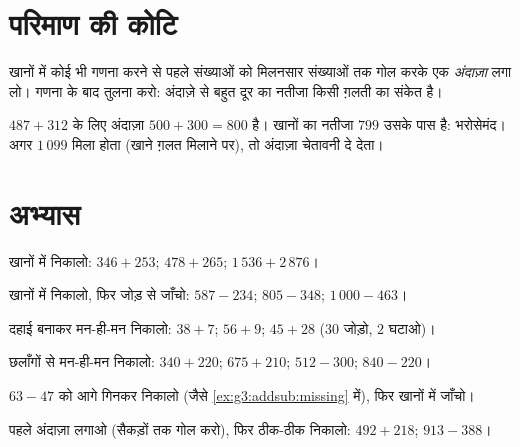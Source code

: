 \section{परिमाण की कोटि}

\begin{method}\label{met:g3:addsub:estimate}
खानों में कोई भी गणना करने से पहले संख्याओं को मिलनसार संख्याओं
तक गोल करके एक \emph{अंदाज़ा} लगा लो। गणना के बाद तुलना करो:
अंदाज़े से बहुत दूर का नतीजा किसी ग़लती का संकेत है।
\end{method}

\begin{example}
$487 + 312$ के लिए अंदाज़ा $500 + 300 = 800$ है। खानों का
नतीजा $799$ उसके पास है: भरोसेमंद। अगर $1\,099$ मिला होता
(खाने ग़लत मिलाने पर), तो अंदाज़ा चेतावनी दे देता।
\end{example}

\section{अभ्यास}

\begin{exercise}[$\star$]\label{exo:g3:addsub:1}
खानों में निकालो: $346 + 253$; \quad $478 + 265$; \quad
$1\,536 + 2\,876$।
\end{exercise}

\begin{exercise}[$\star$]\label{exo:g3:addsub:2}
खानों में निकालो, फिर जोड़ से जाँचो: $587 - 234$; \quad
$805 - 348$; \quad $1\,000 - 463$।
\end{exercise}

\begin{exercise}[$\star$]\label{exo:g3:addsub:3}
दहाई बनाकर मन-ही-मन निकालो: $38 + 7$; \quad $56 + 9$; \quad
$45 + 28$ ($30$ जोड़ो, $2$ घटाओ)।
\end{exercise}

\begin{exercise}[$\star$]\label{exo:g3:addsub:4}
छलाँगों से मन-ही-मन निकालो: $340 + 220$; \quad $675 + 210$; \quad
$512 - 300$; \quad $840 - 220$।
\end{exercise}

\begin{exercise}[$\star$]\label{exo:g3:addsub:5}
$63 - 47$ को आगे गिनकर निकालो (जैसे
\cref{ex:g3:addsub:missing} में), फिर खानों में जाँचो।
\end{exercise}

\begin{exercise}[$\star$]\label{exo:g3:addsub:6}
पहले अंदाज़ा लगाओ (सैकड़ों तक गोल करो), फिर ठीक-ठीक निकालो:
$492 + 218$; \quad $913 - 388$।
\end{exercise}

